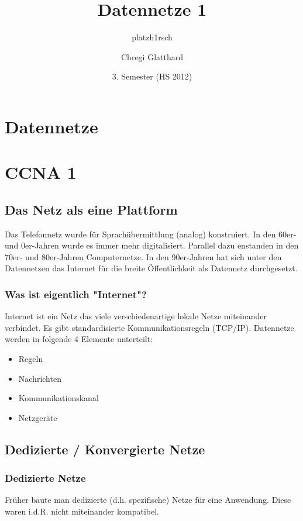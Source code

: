 \documentclass[11pt,a4paper]{article}
\author{platzh1rsch}
\title{Datennetze 1}
\author{Chregi Glatthard}
\date{3. Semester (HS 2012)}
\begin{document}
\maketitle
\thispagestyle{fancy}

\newpage

\tableofcontents	  	

\newpage

\setcounter{page}{1}

\section{Datennetze}

\section{CCNA 1}
\subsection{Das Netz als eine Plattform}
Das Telefonnetz wurde für Sprachübermittlung (analog) konstruiert. In den 60er- und 0er-Jahren wurde es immer mehr digitalisiert. Parallel dazu enstanden in den 70er- und 80er-Jahren Computernetze. \linebreak
In den 90er-Jahren hat sich unter den Datennetzen das Internet für die breite Öffentlichkeit als Datennetz durchgesetzt.
\subsubsection{Was ist eigentlich "Internet"?}
Internet ist ein Netz das viele verschiedenartige lokale Netze miteinander verbindet. Es gibt standardisierte Kommunikationsregeln (TCP/IP).\linebreak
Datennetze werden in folgende 4 Elemente unterteilt:\linebreak
\begin{itemize}
\item Regeln
\item Nachrichten
\item Kommunikationskanal
\item Netzgeräte
\end{itemize}
\subsection{Dedizierte / Konvergierte Netze}
\subsubsection{Dedizierte Netze}
Früher baute man dedizierte (d.h. spezifische) Netze für eine Anwendung. Diese waren i.d.R. nicht miteinander kompatibel.
\end{document}

